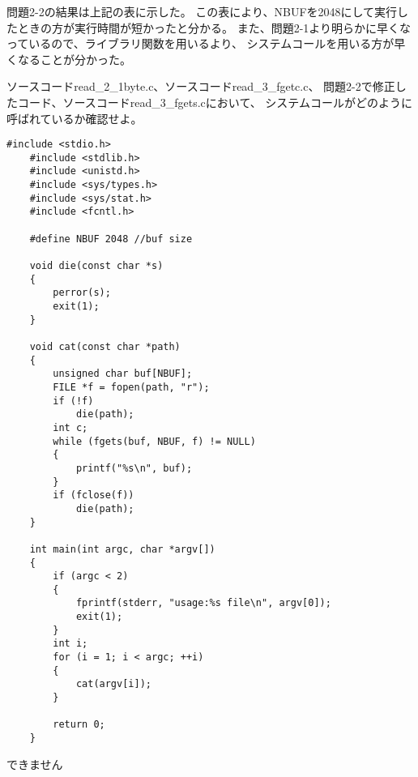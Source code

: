 \documentclass[12pt]{jarticle}
\begin{document}
問題2-2の結果は上記の表に示した。
この表により、NBUFを2048にして実行したときの方が実行時間が短かったと分かる。
また、問題2-1より明らかに早くなっているので、ライブラリ関数を用いるより、
システムコールを用いる方が早くなることが分かった。

\clearpage
\begin{itembox}[l]{}
    ソースコードread\_2\_1byte.c、ソースコードread\_3\_fgetc.c、
    問題2-2で修正したコード、ソースコードread\_3\_fgets.cにおいて、
    システムコールがどのように呼ばれているか確認せよ。
\end{itembox}
\begin{lstlisting}[caption=read\_3\_fgets.c,label=read4, style=lstC]
    #include <stdio.h>
    #include <stdlib.h>
    #include <unistd.h>
    #include <sys/types.h>
    #include <sys/stat.h>
    #include <fcntl.h>
    
    #define NBUF 2048 //buf size
    
    void die(const char *s)
    {
        perror(s);
        exit(1);
    }
    
    void cat(const char *path)
    {
        unsigned char buf[NBUF];
        FILE *f = fopen(path, "r");
        if (!f)
            die(path);
        int c;
        while (fgets(buf, NBUF, f) != NULL)
        {
            printf("%s\n", buf);
        }
        if (fclose(f))
            die(path);
    }
    
    int main(int argc, char *argv[])
    {
        if (argc < 2)
        {
            fprintf(stderr, "usage:%s file\n", argv[0]);
            exit(1);
        }
        int i;
        for (i = 1; i < argc; ++i)
        {
            cat(argv[i]);
        }
    
        return 0;
    }
\end{lstlisting}
\clearpage

できません
\end{document}
